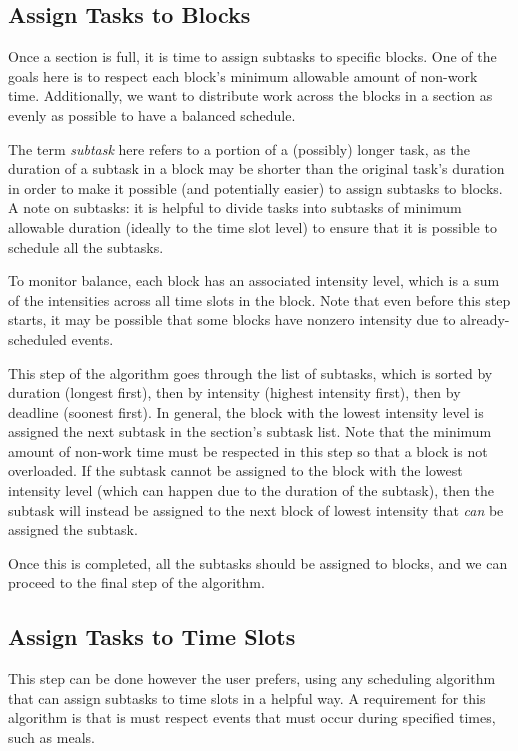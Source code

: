\documentclass{article}
\begin{document}
	\subsection{Assign Tasks to Blocks}
		Once a section is full, it is time to assign subtasks to specific blocks.
		One of the goals here is to respect each block's minimum allowable amount of non-work time.
		Additionally, we want to distribute work across the blocks in a section as evenly as possible to have a balanced schedule.
		
		The term \emph{subtask} here refers to a portion of a (possibly) longer task, as the duration of a subtask in a block may be shorter than the original task's duration in order to make it possible (and potentially easier) to assign subtasks to blocks.
		A note on subtasks: it is helpful to divide tasks into subtasks of minimum allowable duration (ideally to the time slot level) to ensure that it is possible to schedule all the subtasks.
		
		To monitor balance, each block has an associated intensity level, which is a sum of the intensities across all time slots in the block.
		Note that even before this step starts, it may be possible that some blocks have nonzero intensity due to already-scheduled events.
		
		This step of the algorithm goes through the list of subtasks, which is sorted by duration (longest first), then by intensity (highest intensity first), then by deadline (soonest first).
		In general, the block with the lowest intensity level is assigned the next subtask in the section's subtask list.
		Note that the minimum amount of non-work time must be respected in this step so that a block is not overloaded.
		If the subtask cannot be assigned to the block with the lowest intensity level (which can happen due to the duration of the subtask), then the subtask will instead be assigned to the next block of lowest intensity that \emph{can} be assigned the subtask.
		
		Once this is completed, all the subtasks should be assigned to blocks, and we can proceed to the final step of the algorithm.
		
	\subsection{Assign Tasks to Time Slots}
		This step can be done however the user prefers, using any scheduling algorithm that can assign subtasks to time slots in a helpful way.
		A requirement for this algorithm is that is must respect events that must occur during specified times, such as meals.
		
\end{document}
